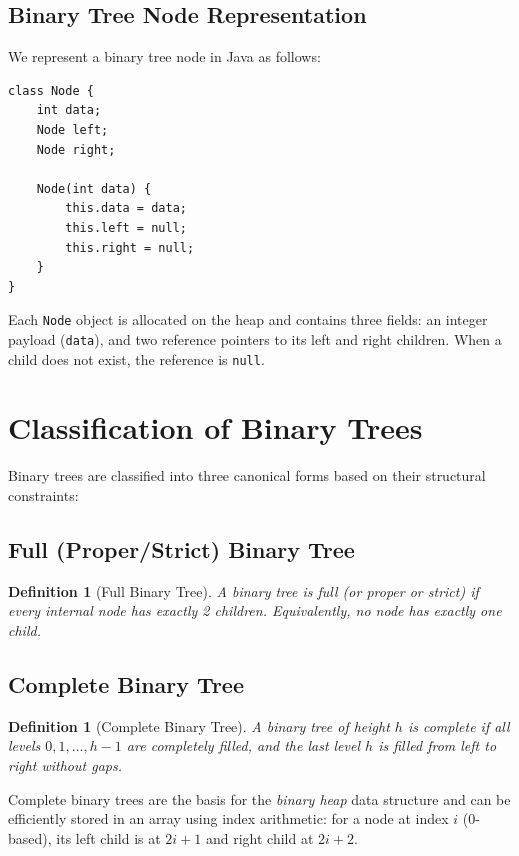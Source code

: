 \documentclass[10pt,journal,compsoc,onecolumn]{IEEEtran}
\newtheorem{definition}[theorem]{Definition}
\begin{document}
\subsection{Binary Tree Node Representation}
We represent a binary tree node in Java as follows:

\begin{verbatim}
class Node {
    int data;
    Node left;
    Node right;

    Node(int data) {
        this.data = data;
        this.left = null;
        this.right = null;
    }
}
\end{verbatim}

Each \texttt{Node} object is allocated on the heap and contains three fields: an integer payload (\texttt{data}), and two reference pointers to its left and right children. When a child does not exist, the reference is \texttt{null}.

\section{Classification of Binary Trees}
\label{sec:types}

Binary trees are classified into three canonical forms based on their structural constraints:

\subsection{Full (Proper/Strict) Binary Tree}
\begin{definition}[Full Binary Tree]
A binary tree is \emph{full} (or \emph{proper} or \emph{strict}) if every internal node has exactly 2 children. Equivalently, no node has exactly one child.
\end{definition}

\subsection{Complete Binary Tree}
\begin{definition}[Complete Binary Tree]
A binary tree of height $h$ is \emph{complete} if all levels $0, 1, \ldots, h-1$ are completely filled, and the last level $h$ is filled from left to right without gaps.
\end{definition}

Complete binary trees are the basis for the \emph{binary heap} data structure and can be efficiently stored in an array using index arithmetic: for a node at index $i$ (0-based), its left child is at $2i + 1$ and right child at $2i + 2$.
\end{document}
